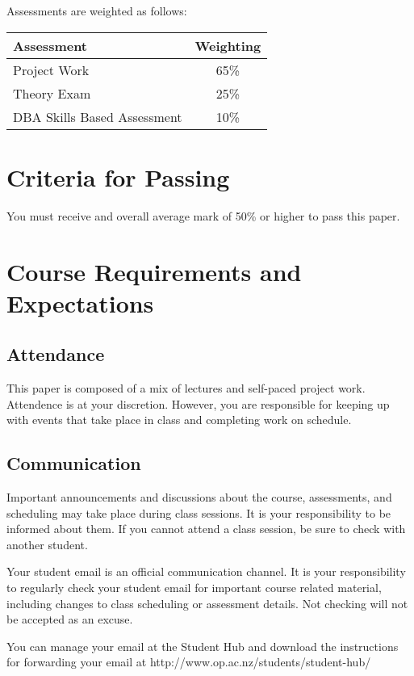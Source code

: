 \documentclass{article}
\begin{document}
Assessments are weighted as follows: \\
\begin{tabular}{|l|c|}
\hline
Assessment                  &  Weighting \\ \hline
Project Work                &  65\% \\ \hline
Theory Exam                 &  25\% \\ \hline
DBA Skills Based Assessment &  10\% \\ \hline
\end{tabular}

\section*{Criteria for Passing}
You must receive and overall average mark of 50\% or higher to pass this paper.

\section*{Course Requirements and Expectations}
\subsection*{Attendance}
This paper is composed of a mix of lectures and self-paced project work.  Attendence is at your discretion. 
However, you are responsible for keeping up with events that take place in class and completing work on schedule. 

\subsection*{Communication}
Important announcements and discussions about the course, assessments, and scheduling may take place during class sessions.  It is your responsibility to be informed about them.  If you cannot attend a class session, be sure to check with another student.

Your student email is an official communication channel. It is your responsibility to regularly check your student email for important course related material, including changes to class scheduling or assessment details. Not checking will not be accepted as an excuse.

You can manage your email at the Student Hub and download the instructions for forwarding your email at http://www.op.ac.nz/students/student-hub/
\end{document}
